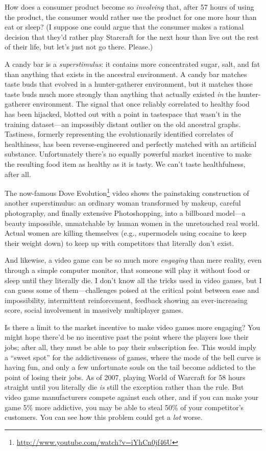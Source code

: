 {{
 How does a consumer product become so \textit{involving} that,
after 57 hours of using the product, the consumer would rather use the
product for one more hour than eat or sleep? (I suppose one could argue
that the consumer makes a rational decision that they'd
rather play Starcraft for the next hour than live out the rest of their
life, but let's just not go there. Please.)}

{
 A candy bar is a \textit{superstimulus}: it contains more
concentrated sugar, salt, and fat than anything that exists in the
ancestral environment. A candy bar matches taste buds that evolved in a
hunter-gatherer environment, but it matches those taste buds much more
strongly than anything that actually existed \textit{in} the
hunter-gatherer environment. The signal that once reliably correlated
to healthy food has been hijacked, blotted out with a point in
tastespace that wasn't in the training dataset---an
impossibly distant outlier on the old ancestral graphs. Tastiness,
formerly representing the evolutionarily identified correlates of
healthiness, has been reverse-engineered and perfectly matched with an
artificial substance. Unfortunately there's no equally
powerful market incentive to make the resulting food item as healthy as
it is tasty. We can't taste healthfulness, after all.}

{
 The now-famous Dove Evolution\footnote{\url{http://www.youtube.com/watch?v=iYhCn0jf46U}} video shows the painstaking
construction of another superstimulus: an ordinary woman transformed by
makeup, careful photography, and finally extensive Photoshopping, into
a billboard model---a beauty impossible, unmatchable by human women in
the unretouched real world. Actual women are killing themselves (e.g.,
supermodels using cocaine to keep their weight down) to keep up with
competitors that literally don't exist.}

{
 And likewise, a video game can be so much more \textit{engaging}
than mere reality, even through a simple computer monitor, that someone
will play it without food or sleep until they literally die. I
don't know all the tricks used in video games, but I
can guess some of them---challenges poised at the critical point
between ease and impossibility, intermittent reinforcement, feedback
showing an ever-increasing score, social involvement in massively
multiplayer games.}

{
 Is there a limit to the market incentive to make video games more
engaging? You might hope there'd be no incentive past
the point where the players lose their jobs; after all, they must be
able to pay their subscription fee. This would imply a
``sweet spot'' for the addictiveness
of games, where the mode of the bell curve is having fun, and only a
few unfortunate souls on the tail become addicted to the point of
losing their jobs. As of 2007, playing World of Warcraft for 58 hours
straight until you literally die \textit{is} still the exception rather
than the rule. But video game manufacturers compete against each other,
and if you can make your game 5\% more addictive, you may be able to
steal 50\% of your competitor's customers. You can see
how this problem could get a \textit{lot} worse.}

}
